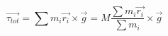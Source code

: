     $$\vec{\tau_{tot}}= \sum m_i\vec{r_i}\times \vec{g} = M\frac{\sum m_i\vec{r_i}}{\sum m_i}\times \vec{g}$$